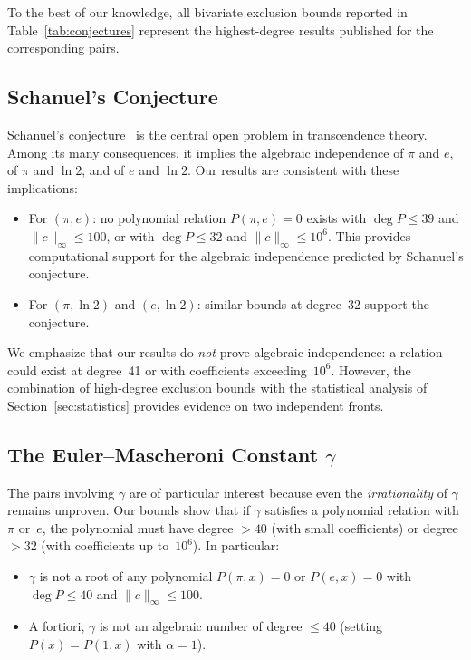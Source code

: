 \documentclass[11pt]{amsart}
\theoremstyle{remark}
\newcommand{\norm}[1]{\lVert #1 \rVert}
\begin{document}
\noindent To the best of our knowledge, all bivariate exclusion bounds
reported in Table~\ref{tab:conjectures} represent the highest-degree results
published for the corresponding pairs.

\subsection{Schanuel's Conjecture}

Schanuel's conjecture~\cite{Lang1966} is the central open problem in
transcendence theory. Among its many consequences, it implies the algebraic
independence of $\pi$ and $e$, of $\pi$ and $\ln 2$, and of $e$ and $\ln 2$.
Our results are consistent with these implications:

\begin{itemize}
  \item For $(\pi, e)$: no polynomial relation $P(\pi, e) = 0$ exists with
    $\deg P \leq 39$ and $\norm{c}_\infty \leq 100$, or with $\deg P \leq 32$
    and $\norm{c}_\infty \leq 10^6$. This provides computational support for
    the algebraic independence predicted by Schanuel's conjecture.
  \item For $(\pi, \ln 2)$ and $(e, \ln 2)$: similar bounds at degree~32
    support the conjecture.
\end{itemize}

We emphasize that our results do \emph{not} prove algebraic independence:
a relation could exist at degree~41 or with coefficients exceeding~$10^6$.
However, the combination of high-degree exclusion bounds with the statistical
analysis of Section~\ref{sec:statistics} provides evidence on two independent
fronts.

\subsection{The Euler--Mascheroni Constant $\gamma$}

The pairs involving $\gamma$ are of particular interest because even the
\emph{irrationality} of $\gamma$ remains unproven. Our bounds show that
if $\gamma$ satisfies a polynomial relation with $\pi$ or~$e$, the
polynomial must have degree $> 40$ (with small coefficients) or
degree $> 32$ (with coefficients up to~$10^6$). In particular:

\begin{itemize}
  \item $\gamma$ is not a root of any polynomial $P(\pi, x) = 0$ or
    $P(e, x) = 0$ with $\deg P \leq 40$ and $\norm{c}_\infty \leq 100$.
  \item A fortiori, $\gamma$ is not an algebraic number of degree $\leq 40$
    (setting $P(x) = P(1, x)$ with $\alpha = 1$).
\end{itemize}
\end{document}

